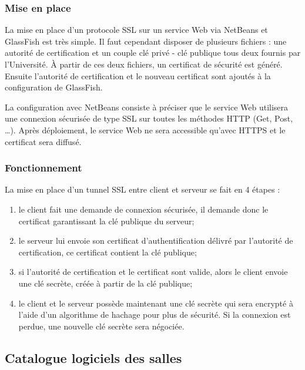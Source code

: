 \subsubsection{Mise en place}

La mise en place d'un protocole SSL sur un service Web via NetBeans et GlassFish est tr\`es simple.
Il faut cependant disposer de plusieurs fichiers : une autorit\'e de certification et un couple cl\'e priv\'e - cl\'e publique tous deux fournis par l'Universit\'e.
\`A partir de ces deux fichiers, un certificat de s\'ecurit\'e est g\'en\'er\'e.
Ensuite l'autorit\'e de certification et le nouveau certificat sont ajout\'es \`a la configuration de GlassFish.

La configuration avec NetBeans consiste \`a pr\'eciser que le service Web utilisera une connexion s\'ecuris\'ee de type SSL sur toutes les m\'ethodes HTTP (Get, Post, \ldots).
Apr\`es d\'eploiement, le service Web ne sera accessible qu'avec HTTPS et le certificat sera diffus\'e.

\subsubsection{Fonctionnement}

La mise en place d'un tunnel SSL entre client et serveur se fait en 4 \'etapes :

\begin{enumerate}
	\item le client fait une demande de connexion s\'ecuris\'ee, il demande donc le certificat garantissant la cl\'e publique du serveur;
	\item le serveur lui envoie son certificat d'authentification d\'elivr\'e par l'autorit\'e de certification, ce certificat contient la cl\'e publique;
	\item si l'autorit\'e de certification et le certificat sont valide, alors le client envoie une cl\'e secr\`ete, cr\'e\'ee \`a partir de la cl\'e publique;
	\item le client et le serveur poss\`ede maintenant une cl\'e secr\`ete qui sera encrypt\'e \`a l'aide d'un algorithme de hachage pour plus de s\'ecurit\'e.
	Si la connexion est perdue, une nouvelle cl\'e secr\`ete sera n\'egoci\'ee.

\end{enumerate}


\subsection{Catalogue logiciels des salles}
\label{section:catalogueLogiciel}

